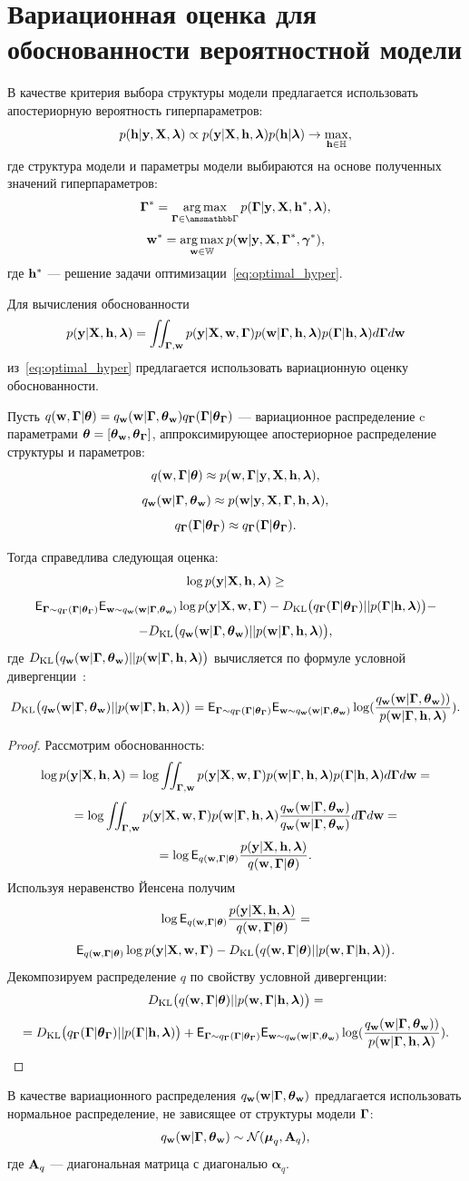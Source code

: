 \section{Вариационная оценка для обоснованности вероятностной модели}
В качестве критерия выбора структуры модели предлагается использовать апостериорную вероятность гиперпараметров:
\begin{equation}
\label{eq:optimal_hyper}
    \posth \propto \EV \priorh \to \max_{\h \in \Hb},
\end{equation}
где структура модели и параметры модели выбираются на основе полученных значений гиперпараметров:
\[
    \G^* = \argmax_{\G \in \Gb} p(\G|\y, \X, \h^*, \lam ),
\]
\[
    \w^* = \argmax_{\w \in \Wb} p(\w|\y, \X, \G^*, \g^*),
\]
где $\h^*$ --- решение задачи оптимизации~\eqref{eq:optimal_hyper}.

Для вычисления обоснованности $$\EV = \iint_{\G, \w}\LL \priorw \priorG d\G d\w$$ из~\eqref{eq:optimal_hyper} предлагается использовать вариационную оценку обоснованности.

\begin{theorem}
Пусть $\q = \qw \qG$ --- вариационное распределение c параметрами $\teta= [\tetaw, \tetaG ]$, аппроксимирующее апостериорное распределение структуры и параметров:
\[
    \q \approx \post,
\]
\[
    \qw  \approx \postw,
\]
\[
    \qG \approx \qG.
\]

Тогда справедлива следующая оценка:
\begin{equation}
\label{eq:full_elbo}
\log \EV \geq
\end{equation}
\[
 \E_{\G \sim \qG} \E_{\w \sim \qw} \log \LL - \KL{\qG}{\priorG} - 
\]
\[
 - \KL{\qw}{\priorw},
\]
где $\KL{\qw}{\priorw}$ вычисляется по формуле условной дивергенции~\cite{TODO}:
\[
\KL{\qw}{\priorw} = \E_{\G \sim \qG} \E_{\w \sim \qw} \log (\frac{\qw)}{\priorw}).
\]
\end{theorem}

\begin{proof}
Рассмотрим обоснованность:
\[
\log \EV  =  \log \iint_{\G,\w} \LL \priorw \priorG d\G d\w  =
\]
\[
   = \log\iint_{\G,\w} \LL \priorw \frac{\qw}{\qw}d\G d\w =
\]
\[
  =  \log \E_{\q} \frac{\EV}{\q}.
\]
Используя неравенство Йенсена получим 
\[
 \log \E_{\q} \frac{\EV}{\q} =
\]
\[
   \E_{\q} \log \LL - \KL{\q}{\prior}.
\]
Декомпозируем распределение $q$ по свойству условной дивергенции:
\[
\KL{\q}{\prior} = 
\]
\[
= \KL{\qG}{\priorG} + \E_{\G \sim \qG} \E_{\w \sim \qw} \log (\frac{\qw)}{\priorw}).    
\]
\end{proof}
В качестве вариационного распределения $\qw$ предлагается использовать нормальное распределение, не зависящее от структуры модели $\G$:
\[
    \qw  \sim \mathcal{N}(\boldsymbol{\mu}_q, \A_q), 
\]
где $\A_q$ --- диагональная матрица с диагональю $\boldsymbol{\alpha}_q$.

